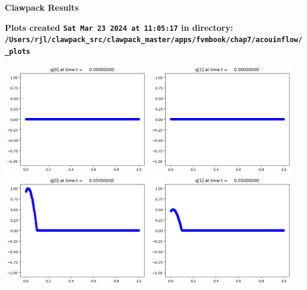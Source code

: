 \documentclass[11pt]{article}
\begin{document}
        \begin{center}{\Large\bf Clawpack Results}\vskip 5pt
        
        \bf Plots created {\tt Sat Mar 23 2024 at 11:05:17} in directory: \vskip 5pt
        \verb+/Users/rjl/clawpack_src/clawpack_master/apps/fvmbook/chap7/acouinflow/_plots+
        \end{center}
        \vskip 5pt
        \includegraphics[width=0.475\textwidth]{frame0000fig0.png}
\includegraphics[width=0.475\textwidth]{frame0000fig1.png}
\vskip 10pt 
\includegraphics[width=0.475\textwidth]{frame0001fig0.png}
\includegraphics[width=0.475\textwidth]{frame0001fig1.png}
\end{document}
